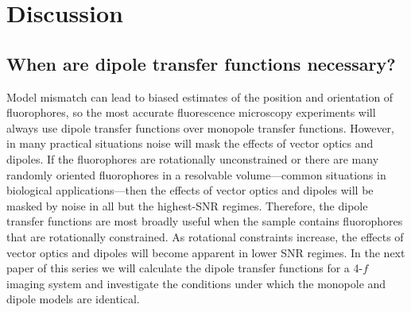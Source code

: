 \documentclass[]{osa-article}
\begin{document}
  
 
\section{Discussion}\label{sec:discussion}
\subsection{When are dipole transfer functions necessary?}
Model mismatch can lead to biased estimates of the position and orientation of
fluorophores, so the most accurate fluorescence microscopy experiments will
always use dipole transfer functions over monopole transfer functions. However,
in many practical situations noise will mask the effects of vector optics and
dipoles. If the fluorophores are rotationally unconstrained or there are many
randomly oriented fluorophores in a resolvable volume---common situations in
biological applications---then the effects of vector optics and dipoles will be
masked by noise in all but the highest-SNR regimes. Therefore, the dipole
transfer functions are most broadly useful when the sample contains fluorophores
that are rotationally constrained. As rotational constraints increase, the
effects of vector optics and dipoles will become apparent in lower SNR regimes.
In the next paper of this series we will calculate the dipole transfer functions
for a 4-$f$ imaging system and investigate the conditions under which the
monopole and dipole models are identical.
 
\end{document}
